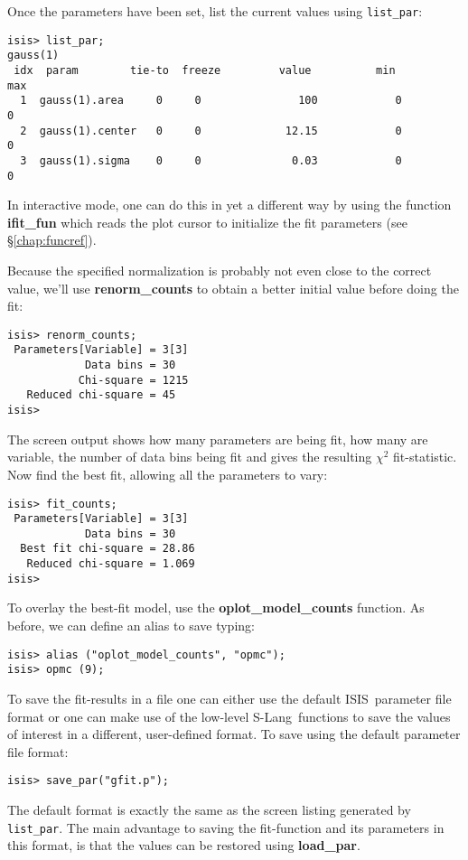 \documentclass{book}
\newcommand{\isisx}{{\sc ISIS~}}
\newcommand{\slang}{{\sc S-Lang}}
\begin{document}
{Once the parameters have been set, list the current values
using \verb|list_par|:
\begin{verbatim}
isis> list_par;
gauss(1)
 idx  param        tie-to  freeze         value          min          max
  1  gauss(1).area     0     0               100            0            0
  2  gauss(1).center   0     0             12.15            0            0
  3  gauss(1).sigma    0     0              0.03            0            0
\end{verbatim}
In interactive mode, one can do this in yet a different way
by using the function {\bf ifit\_fun} which reads
the plot cursor to initialize the fit parameters
(see \S\ref{chap:funcref}).

Because the specified normalization is probably not even close to
the correct value, we'll use {\bf renorm\_counts} to obtain a better
initial value before doing the fit:
\begin{verbatim}
isis> renorm_counts;
 Parameters[Variable] = 3[3]
            Data bins = 30
           Chi-square = 1215
   Reduced chi-square = 45
isis>
\end{verbatim}
The screen output shows how many parameters are being fit, how
many are variable, the number of data bins being fit and gives the
resulting $\chi^2$ fit-statistic. Now find the best fit, allowing
all the parameters to vary:
\begin{verbatim}
isis> fit_counts;
 Parameters[Variable] = 3[3]
            Data bins = 30
  Best fit chi-square = 28.86
   Reduced chi-square = 1.069
isis>
\end{verbatim}
To overlay the best-fit model, use the {\bf oplot\_model\_counts} function.
As before, we can define an alias to save typing:
\begin{verbatim}
isis> alias ("oplot_model_counts", "opmc");
isis> opmc (9);
\end{verbatim}

To save the fit-results in a file one can either use the default
\isisx parameter file format or one can make use of the low-level
\slang\ functions to save the values of interest in a different,
user-defined format.  To save using the default parameter file
format:
\begin{verbatim}
isis> save_par("gfit.p");
\end{verbatim}
The default format is exactly the same as the screen listing
generated by {\tt list\_par}.  The main advantage to saving the
fit-function and its parameters in this format, is that the values
can be restored using {\bf load\_par}.

}
\end{document}
